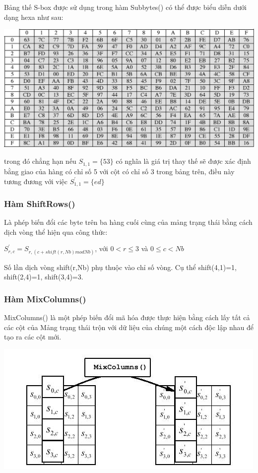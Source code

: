 \documentclass[paper=a4, fontsize=11pt]{scrartcl}	%
\numberwithin{equation}{section}															%
\numberwithin{figure}{section}																%
\numberwithin{table}{section}																%
\begin{document}
		Bảng thế S-box được sử dụng trong hàm Subbytes() có thể được biểu diễn dưới dạng hexa như sau:
		\begin{center}
		\includegraphics[scale=0.4]{AES3S-Box}
		\end{center}
		trong đó chẳng hạn nếu $S_{1,1}=\{53\}$ có nghĩa là giá trị thay thế sẽ được xác định bằng giao của hàng có chỉ số 5 với cột có chỉ số 3 trong bảng trên, điều này tương đương với việc $S^{'}_{1,1}=\{ed\}$
		\subsubsection{Hàm ShiftRows()}
		Là phép biến đổi các byte trên ba hàng cuối cùng của mảng trạng thái bằng cách dịch vòng thể hiện qua công thức:
		\begin{center}
		$S^{'}_{r,c}=S_{r,(c+shift(r,Nb)mod Nb)}$, với $ 0 < r \le 3$ và $0 \le c < Nb$
		\end{center}
		Số lần dịch vòng shift(r,Nb) phụ thuộc vào chỉ số vòng. Cụ thể shift(4,1)=1, shift(2,4)=1, shift(3,4)=3.
		\subsubsection{Hàm MixColumns()}
		MixColumns() là một phép biến đổi mã hóa được thực hiện bằng cách lấy tất cả các cột của Mảng trạng thái trộn với dữ liệu của chúng một cách độc lập nhau để tạo ra các cột mới.
		\begin{center}
		\includegraphics[scale=0.4]{AES4MIXCOLUME}
		\end{center}
		
\end{document}
